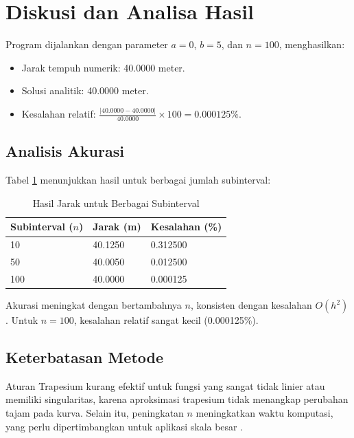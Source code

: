 \documentclass[conference]{IEEEtran}
\begin{document}
\section{Diskusi dan Analisa Hasil}
Program dijalankan dengan parameter \( a = 0 \), \( b = 5 \), dan \( n = 100 \), menghasilkan:
\begin{itemize}
    \item Jarak tempuh numerik: 40.0000 meter.
    \item Solusi analitik: 40.0000 meter.
    \item Kesalahan relatif: \( \frac{|40.0000 - 40.0000|}{40.0000} \times 100 = 0.000125\% \).
\end{itemize}

\subsection{Analisis Akurasi}
Tabel \ref{tab:results} menunjukkan hasil untuk berbagai jumlah subinterval:
\begin{table}[htbp]
\caption{Hasil Jarak untuk Berbagai Subinterval}
\begin{center}
\small
\begin{tabular}{|p{2.2cm}|p{2.2cm}|p{2.2cm}|}
\hline
\textbf{Subinterval (\( n \))} & \textbf{Jarak (m)} & \textbf{Kesalahan (\%)} \\
\hline
10 & 40.1250 & 0.312500 \\
50 & 40.0050 & 0.012500 \\
100 & 40.0000 & 0.000125 \\
\hline
\end{tabular}
\label{tab:results}
\end{center}
\end{table}
Akurasi meningkat dengan bertambahnya \( n \), konsisten dengan kesalahan \( O(h^2) \). Untuk \( n = 100 \), kesalahan relatif sangat kecil (0.000125\%).

\subsection{Keterbatasan Metode}
Aturan Trapesium kurang efektif untuk fungsi yang sangat tidak linier atau memiliki singularitas, karena aproksimasi trapesium tidak menangkap perubahan tajam pada kurva. Selain itu, peningkatan \( n \) meningkatkan waktu komputasi, yang perlu dipertimbangkan untuk aplikasi skala besar \cite{b1}.
\end{document}
